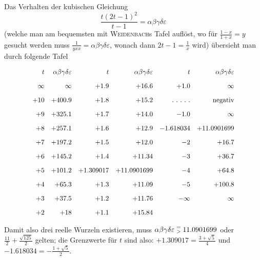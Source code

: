 Das Verhalten der kubischen Gleichung
\[
\frac{t(2t-1)^2}{t-1}=\alpha\beta\gamma\delta\varepsilon
\]
(welche man am bequemsten mit \textsc{Weidenbach}s Tafel auflöst, wo für
$\frac{1-x}{1+x}=y$
gesucht werden muss $\frac{1}{yxx}=\alpha\beta\gamma\delta\varepsilon$, wonach dann
$2t-1=\frac1x$ wird) übersieht man durch folgende Tafel



\par\nopagebreak%
\begingroup\small\setlength{\arraycolsep}{2pt}\[
\resizebox{.84\linewidth}{!}{$\displaystyle \begin{array}{r@{\quad}r@{\quad}r@{\quad}r@{\quad}r@{\quad}r} t&\alpha\beta\gamma\delta\varepsilon&t&\alpha\beta\gamma\delta\varepsilon&t&\alpha\beta\gamma\delta\varepsilon\\[9pt] \infty&\infty&+1.9&+16.6&+1.0&\infty\\[9pt] +10&+400.9&+1.8&+15.2&\mathord{.}\ \mathord{.}\ \mathord{.}\ \mathord{.}\ \mathord{.}&\text{negativ}\\[9pt] +9&+325.1&+1.7&+14.0&-1.0&\infty\\[9pt] +8&+257.1&+1.6&+12.9&-1.618034&+11.0901699\\[9pt] +7&+197.2&+1.5&+12.0&-2&+16.7\\[9pt] +6&+145.2&+1.4&+11.34&-3&+36.7\\[9pt] +5&+101.2&+1.309017&+11.0901699&-4&+64.8\\[9pt] +4&+65.3&+1.3&+11.09&-5&+100.8\\[9pt] +3&+37.5&+1.2&+11.76&-\infty&\infty\\[9pt] +2&+18&+1.1&+15.84&& \end{array}$}
\]\endgroup\par%



Damit also drei reelle Wurzeln existieren, muss
$\alpha\beta\gamma\delta\varepsilon\mathrel{\substack{=\\>}}11.0901699$
oder $\frac{11}{2}+\frac{\surd{125}}{2}$ gelten; die Grenzwerte für $t$ sind also:
$+1.309017=\frac{3+\surd5}{4}$ und $-1.618034=-\frac{1+\surd5}{2}$.

\clearpage
\endgroup
